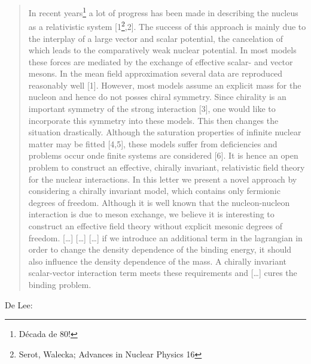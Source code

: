 \begin{quote}
	In recent years\footnote{Década de 80!} a lot of progress has been made in describing the nucleus as a relativistic system [1\footnote{Serot, Walecka; Advances in Nuclear Physics 16},2]. The success of this approach is mainly due to the interplay of a large vector and scalar potential, the cancelation of which leads to the comparatively weak nuclear potential. In most models these forces are mediated by the exchange of effective scalar- and vector mesons. In the mean field approximation several data are reproduced reasonably well [1].
	However, most models assume an explicit mass for the nucleon and hence do not posses chiral symmetry. Since chirality is an important symmetry of the strong interaction [3], one would like to incorporate this symmetry into these models. This then changes the situation drastically. Although the saturation properties of infinite nuclear matter may be fitted [4,5], these models suffer from deficiencies and problems occur onde finite systems are considered [6]. It is hence an open problem to construct an effective, chirally invariant, relativistic field theory for the nuclear interactions.
	In this letter we present a novel approach by considering a chirally invariant model, which contains only fermionic degrees of freedom. Although it is well known that the nucleon-nucleon interaction is due to meson exchange, we believe it is interesting to construct an effective field theory without explicit mesonic degrees of freedom. [\dots]
	[\dots]
	[\dots] if we introduce an additional term in the lagrangian in order to change the density dependence of the binding energy, it should also influence the density dependence of the mass. A chirally invariant scalar-vector interaction term meets these requirements and [\dots] cures the binding problem.
\end{quote}
%
De Lee\cite{japoneses}:
